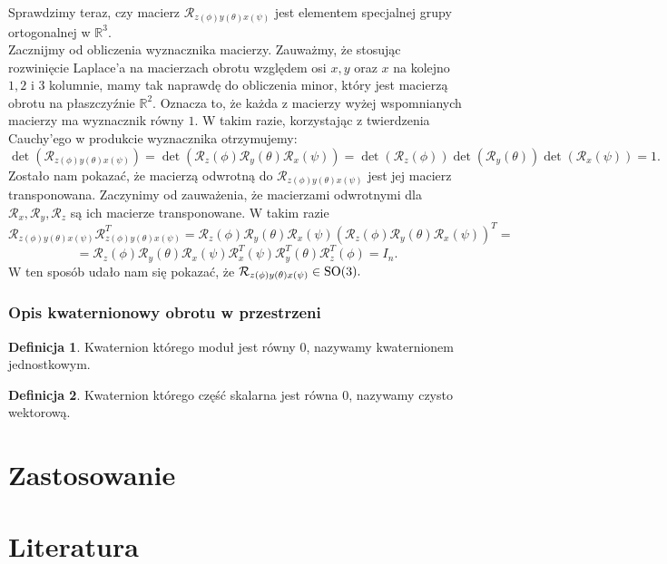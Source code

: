 \documentclass[a4paper,twoside,11pt,reqno]{mwrep}
\theoremstyle{plain} \newtheorem{twr}{Twierdzenie}
\theoremstyle{plain} \newtheorem{lem}{Lemat}
\theoremstyle{definition} \newtheorem{defi}{Definicja}
\theoremstyle{remark} \newtheorem*{wni}{Wniosek}
\theoremstyle{definition} \newtheorem{uwaga}{Uwaga}
\theoremstyle{definition}\newtheorem{prz}{Przykład}
\begin{document}
Sprawdzimy teraz, czy macierz $\mathcal{R}_{z(\phi)y(\theta)x(\psi)}$ jest 
elementem specjalnej grupy ortogonalnej w $\mathbb{R}^3$.\\
Zacznijmy od obliczenia wyznacznika macierzy. Zauważmy, że stosując rozwinięcie Laplace'a
na macierzach obrotu względem osi $x,y$ oraz $x$ na kolejno $1,2$ i $3$ kolumnie, mamy tak naprawdę
do obliczenia minor, który jest macierzą obrotu na płaszczyźnie $\mathbb{R}^2$. Oznacza to, że każda 
z macierzy wyżej wspomnianych macierzy ma wyznacznik równy $1$. 
W takim razie, korzystając z twierdzenia Cauchy'ego w produkcie wyznacznika otrzymujemy: 
$$\det\left(\mathcal{R}_{z(\phi)y(\theta)x(\psi)}\right) = 
\det \left( \mathcal{R}_z(\phi)\mathcal{R}_y(\theta)\mathcal{R}_x(\psi)\right) = 
\det \left( \mathcal{R}_z(\phi)\right)\det\left(\mathcal{R}_y(\theta)\right)
\det\left(\mathcal{R}_x(\psi)\right)=1.$$
Zostało nam pokazać, że macierzą odwrotną do $\mathcal{R}_{z(\phi)y(\theta)x(\psi)}$
jest jej macierz transponowana. Zaczynimy od zauważenia, że macierzami odwrotnymi dla 
$\mathcal{R}_{x},\mathcal{R}_{y},\mathcal{R}_{z}$ są ich macierze transponowane.
W takim razie 
$$\mathcal{R}_{z(\phi)y(\theta)x(\psi)}\mathcal{R}^T_{z(\phi)y(\theta)x(\psi)} = 
\mathcal{R}_z(\phi)\mathcal{R}_y(\theta)\mathcal{R}_x(\psi)
\left(\mathcal{R}_z(\phi)\mathcal{R}_y(\theta)\mathcal{R}_x(\psi)\right)^T=$$
$$=\mathcal{R}_z(\phi)\mathcal{R}_y(\theta)\mathcal{R}_x(\psi)
\mathcal{R}^T_x(\psi)\mathcal{R}^T_y(\theta)\mathcal{R}^T_z(\phi) = I_n.$$
W ten sposób udało nam się pokazać, że  $\mathcal{R}_{z(\phi)y(\theta)x(\psi)} \in \textup{SO}(3).$

\subsection{Opis kwaternionowy obrotu w przestrzeni }
\begin{defi}
Kwaternion którego moduł jest równy $0$, nazywamy kwaternionem jednostkowym.
\end{defi}
\begin{defi}
Kwaternion którego część skalarna jest równa $0$, nazywamy czysto wektorową.
\end{defi}


\chapter{Zastosowanie}
\chapter{Literatura}
\end{document}
